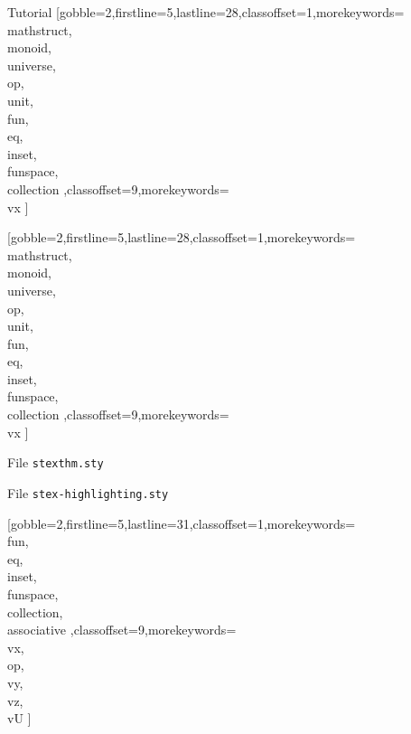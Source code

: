 \documentclass{stex}
\begin{document}
\begin{sfragment}{Tutorial}
    [gobble=2,firstline=5,lastline=28,classoffset=1,morekeywords={
    \\mathstruct,\\monoid,\\universe,\\op,\\unit,\\fun,\\eq,\\inset,
    \\funspace,\\collection
    },classoffset=9,morekeywords={
      \\vx
    }]

    [gobble=2,firstline=5,lastline=28,classoffset=1,morekeywords={
    \\mathstruct,\\monoid,\\universe,\\op,\\unit,\\fun,\\eq,\\inset,
    \\funspace,\\collection
    },classoffset=9,morekeywords={
      \\vx
    }]

    \begin{sexample}
      \begin{mdframed}[linewidth=1pt,backgroundcolor=white]\small
        \hfill File \texttt{stexthm.sty}
        
      \end{mdframed}
    \end{sexample}

    \begin{sexample}
      \begin{mdframed}[linewidth=1pt,backgroundcolor=white]\small
        \hfill File \texttt{stex-highlighting.sty}
        
        
      \end{mdframed}
    \end{sexample}

    [gobble=2,firstline=5,lastline=31,classoffset=1,morekeywords={
    \\fun,\\eq,\\inset,
    \\funspace,\\collection,\\associative
    },classoffset=9,morekeywords={
      \\vx,\\op,\\vy,\\vz,\\vU
    }]


\end{sfragment}
\end{document}
